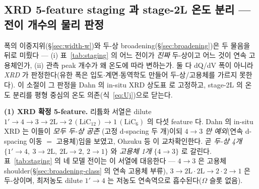 \subsection{XRD 5-feature staging 과 stage-2L 온도 분리 --- 전이 개수의 물리 판정}\label{sec:gr-staging2L}
폭의 이중지위(\S\ref{sec:width-w})와 두-상 broadening(\S\ref{sec:broadening})은 두 물음을 뒤로 미뤘다 --- (i)
표~\ref{tab:staging} 의 어느 전이가 \emph{진짜} 두-상이고 어느 것이 연속 고용체인가, (ii) 관측 peak 개수가 왜
온도에 따라 변하는가. 둘 다 dQ/dV 폭이 아니라 \emph{XRD} 가 판정한다(유한 폭은 입도$\cdot$계면$\cdot$동역학도
만들어 두-상/고용체를 가르지 못한다). 이 소절이 그 판정을 Dahn 의 in-situ XRD 상도표\cite{dahn1991} 로 고정하고,
stage-2L 의 온도 분리를 평형 중심의 온도 의존(식~\eqref{eq:Uj})으로 닫는다.

\textbf{(1) XRD 확정 5-feature.} 리튬화 서열은 dilute $1'\!\to\!4\!\to\!3\!\to\!2\mathrm L\!\to\!2\,(\mathrm{LiC_{12}})
\!\to\!1\,(\mathrm{LiC_6})$ 의 다섯 feature 다\cite{dahn1991}. Dahn 의 in-situ XRD 는 이들이 \emph{모두 두-상 공존}
(고정 d-spacing 두 개)이되 \emph{$4\!\to\!3$ 만 예외}(연속 d-spacing 이동 $=$ 고용체)임을 보였고, Ohzuku
등\cite{ohzuku1993} 이 교차확인한다. 곧 \emph{두-상 4개}
$\{1'\!\to\!4,\ 3\!\to\!2\mathrm L,\ 2\mathrm L\!\to\!2,\ 2\!\to\!1\}$ 와 \emph{고용체 1개} $\{4\!\to\!3\}$ 로 갈린다.
표~\ref{tab:staging} 의 네 모델 전이는 이 서열에 대응한다 --- $4\!\to\!3$ 은 고용체 shoulder(\S\ref{sec:broadening-class}
의 연속 고용체 부류), $3\!\to\!2\mathrm L\cdot2\mathrm L\!\to\!2\cdot2\!\to\!1$ 은 두-상이며, 최저농도 dilute
$1'\!\to\!4$ 는 저농도 연속역으로 흡수된다($\Omega$ 슬롯 없음).

